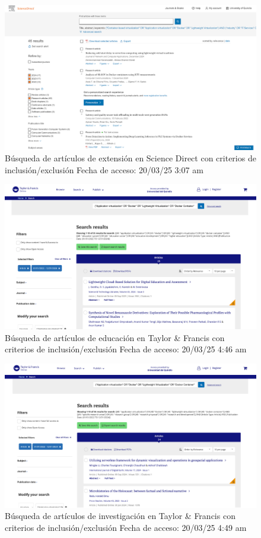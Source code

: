 \FloatBarrier\begin{figure}[H]
    \centering
    \includegraphics[width=\textwidth,keepaspectratio]{apendices/BD/criterios/SD-ind.png}
    \caption{Búsqueda de artículos de extensión en Science Direct con criterios de inclusión/exclusión
    Fecha de acceso: 20/03/25 3:07 am
    }
\end{figure}
\FloatBarrier\begin{figure}[H]
    \centering
    \includegraphics[width=\textwidth,keepaspectratio]{apendices/BD/criterios/TF-ed.png}
    \caption{Búsqueda de artículos de educación en Taylor \& Francis con criterios de inclusión/exclusión
    Fecha de acceso: 20/03/25 4:46 am
    }
\end{figure}
\FloatBarrier\begin{figure}[H]
    \centering
    \includegraphics[width=\textwidth,keepaspectratio]{apendices/BD/criterios/TF-inv.png}
    \caption{Búsqueda de artículos de investigación en Taylor \& Francis con criterios de inclusión/exclusión
    Fecha de acceso: 20/03/25 4:49 am
    }
\end{figure}
